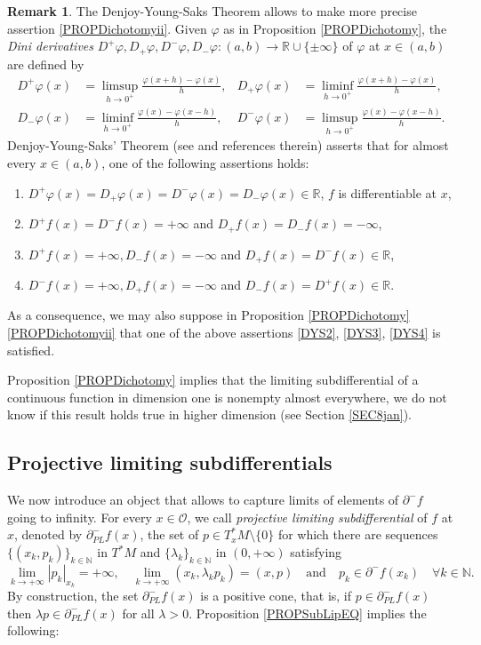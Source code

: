 \documentclass[JEP,XML,SOM,Unicode,NoFloatCountersInSection,published]{cedram}
\newcommand\R{\mathbb R}
\newcommand\N{\mathbb N}
\theoremstyle{definition}
\newtheorem{remark}[theorem]{Remark}
\begin{document}
\begin{remark}\label{RemDYS}
The Denjoy-Young-Saks Theorem allows to make more precise assertion \eqref{PROPDichotomyii}. Given $\varphi$ as in Proposition \ref{PROPDichotomy}, the {\it Dini derivatives} $D^+\varphi, D_+\varphi,D^-\varphi, D_-\varphi:(a,b) \to \R\cup \{\pm \infty\}$ of $\varphi$ at $x\in (a,b)$ are defined by
\begin{align*}
D^+\varphi(x) &= \limsup_{h\to 0^+} \frac{\varphi(x+h)-\varphi(x)}{h}, & D_+\varphi(x) &= \liminf_{h\to 0^+} \frac{\varphi(x+h)-\varphi(x)}{h},
\\
D_-\varphi(x) &= \liminf_{h\to 0^+} \frac{\varphi(x)-\varphi(x-h)}{h}, & D^-\varphi(x) &= \limsup_{h\to 0^+} \frac{\varphi(x)-\varphi(x-h)}{h}.
\end{align*}
Denjoy-Young-Saks' Theorem (see \cite{hanson34} and references therein) asserts that for almost every $x\in (a,b)$, one of the following assertions holds:
\begin{enumerate}
\item\label{DYS1}
$D^+\varphi(x)= D_+\varphi(x)=D^-\varphi(x)= D_-\varphi(x) \in \R$, \ie $f$ is differentiable at $x$,
\item\label{DYS2}
$D^+f(x)=D^-f(x)=+\infty$ and $D_+f(x)=D_-f(x)=-\infty$,
\item\label{DYS3}
$D^+f(x)=+\infty, D_-f(x)=-\infty$ and $D_+f(x)=D^-f(x)\in \R$,
\item\label{DYS4}
$D^-f(x)=+\infty, D_+f(x)=-\infty$ and $D_-f(x)=D^+f(x)\in \R$.
\end{enumerate}
As a consequence, we may also suppose in Proposition \ref{PROPDichotomy}\eqref{PROPDichotomyii} that one of the above assertions \eqref{DYS2}, \eqref{DYS3}, \eqref{DYS4} is satisfied.
\end{remark}

Proposition \ref{PROPDichotomy} implies that the limiting subdifferential of a continuous function in dimension one is nonempty almost everywhere, we do not know if this result holds true in higher dimension (see Section \ref{SEC8jan}).

\subsection{Projective limiting subdifferentials}

We now introduce an object that allows to capture limits of elements of $\partial^-f$ going to infinity. For every $x\in \mathcal{O}$, we call {\it projective limiting subdifferential} of $f$ at $x$, denoted by $\partial^-_{PL}f(x)$, the set of $p\in T_x^*M\setminus \{0\}$ for which there are sequences $\{(x_k,p_k)\}_{k\in \N}$ in $T^*M$ and $\{\lambda_k\}_{k\in \N}$ in $(0,+\infty)$ satisfying
\[
\lim_{k\to +\infty} \left|p_k\right|_{x_k} = +\infty, \quad \lim_{k\to +\infty} \left(x_k,\lambda_k p_k\right) = (x,p)
\quad
\text{and} \quad p_k \in \partial^-f(x_k) \quad \forall k \in \N.
\]
By construction, the set $\partial^-_{PL}f(x)$ is a positive cone, that is, if $p\in \partial^-_{PL}f(x)$ then $\lambda p\in \partial^-_{PL}f(x)$ for all $\lambda >0$. Proposition \ref{PROPSubLipEQ} implies the following:
\end{document}

